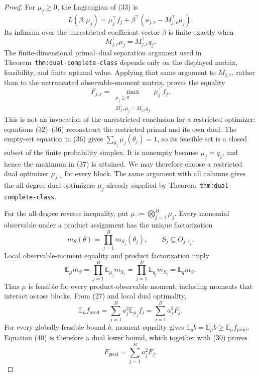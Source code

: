 \documentclass{article}
\begin{document}
\begin{proof}
For \(\mu_j\ge0\), the Lagrangian of (33) is
\[
L(\beta,\mu_j)
=\mu_j^{\top}f_j
+\beta^{\top}(a_{j,r}-M_{j,r}^{\top}\mu_j).
\tag{35}
\]
Its infimum over the unrestricted coefficient vector \(\beta\) is finite exactly when
\[
M_{j,r}^{\top}\mu_j=M_{j,r}^{\top}q_j.
\tag{36}
\]
The finite-dimensional primal--dual separation argument used in Theorem~\texttt{thm:dual-complete-class} depends only on the displayed matrix, feasibility, and finite optimal value.  Applying that same argument to \(M_{j,r}\), rather than to the untruncated observable-moment matrix, proves the equality
\[
F_{j,r}
=\max_{\substack{\mu_j\ge0\\
M_{j,r}^{\top}\mu_j=M_{j,r}^{\top}q_j}}
\mu_j^{\top}f_j.
\tag{37}
\]
This is not an invocation of the unrestricted conclusion for a restricted optimizer: equations (32)--(36) reconstruct the restricted primal and its own dual.  The empty-set equation in (36) gives \(\sum_{\theta_j}\mu_j(\theta_j)=1\), so its feasible set is a closed subset of the finite probability simplex.  It is nonempty because \(\mu_j=q_j\), and hence the maximum in (37) is attained.  We may therefore choose a restricted dual optimizer \(\mu_{j,r}\) for every block.  The same argument with all columns gives the all-degree dual optimizers \(\mu_j\) already supplied by Theorem~\texttt{thm:dual-complete-class}.

For the all-degree reverse inequality, put \(\mu:=\bigotimes_{j=1}^B\mu_j\).  Every monomial observable under a product assignment has the unique factorization
\[
m_S(\theta)=\prod_{j=1}^Bm_{S_j}(\theta_j),
\qquad
S_j\subseteq O_{j,z_j}.
\tag{38}
\]
Local observable-moment equality and product factorization imply
\[
\mathbb E_\mu m_S
=\prod_{j=1}^B\mathbb E_{\mu_j}m_{S_j}
=\prod_{j=1}^B\mathbb E_{q_j}m_{S_j}
=\mathbb E_qm_S.
\tag{39}
\]
Thus \(\mu\) is feasible for every product-observable moment, including moments that interact across blocks.  From (27) and local dual optimality,
\[
\mathbb E_\mu f_{\mathrm{prod}}
=\sum_{j=1}^Ba_j^2\mathbb E_{\mu_j}f_j
=\sum_{j=1}^Ba_j^2F_j.
\tag{40}
\]
For every globally feasible bound \(b\), moment equality gives \(\mathbb E_qb=\mathbb E_\mu b\ge\mathbb E_\mu f_{\mathrm{prod}}\).  Equation (40) is therefore a dual lower bound, which together with (30) proves
\[
F_{\mathrm{prod}}=\sum_{j=1}^Ba_j^2F_j.
\tag{41}
\]


\end{proof}
\end{document}
